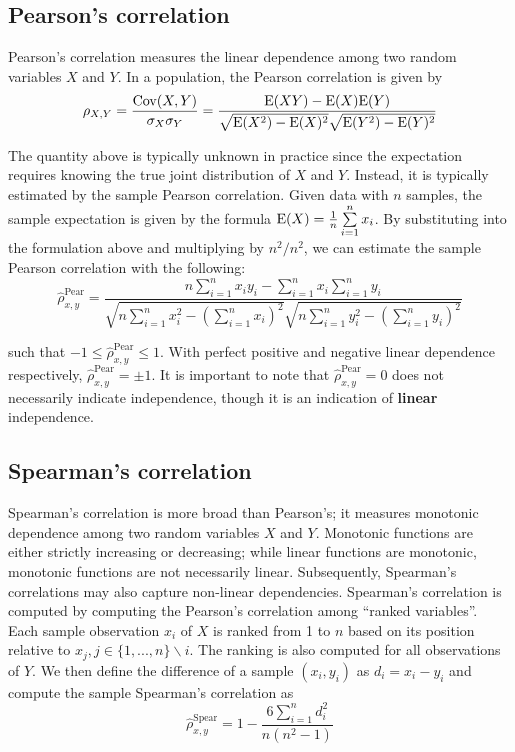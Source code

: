 \subsection{Pearson's correlation}

Pearson's correlation measures the linear dependence among two random variables
$X$ and $Y$. In a population, the Pearson correlation is given by
$$\rho_{X,Y}=\frac{\mathrm{Cov}(X,Y)}{\sigma_X \sigma_Y} =
\frac{\mathrm{E}(XY)-\mathrm{E}(X)\mathrm{E}(Y)}{\sqrt{\mathrm{E}(X^2)-\mathrm{E}(X)^2} \sqrt{\mathrm{E}(Y^2)-\mathrm{E}(Y)^2}}$$ 

The quantity above is typically unknown in practice since the expectation 
requires knowing the true joint distribution of $X$ and $Y$. Instead, it is 
typically estimated by the sample Pearson correlation. Given data with $n$ 
samples, the sample expectation is given by the formula  
$\mathrm{E}(X)=\frac{1}{n}\sum\limits_{i=1}^{n}x_i$. 
By substituting into the formulation above and multiplying by $n^2/n^2$, we can 
estimate the sample Pearson correlation with the following:
$$\hat{\rho}_{x,y}^\text{Pear}=
\frac{n \sum\limits_{i=1}^{n} x_i y_i - \sum\limits_{i=1}^{n} x_i
	\sum\limits_{i=1}^{n} y_i}
{\sqrt{n\sum\limits_{i=1}^{n} x_i^2-\left(\sum\limits_{i=1}^{n} x_i\right)^2} 
	\sqrt{n\sum\limits_{i=1}^{n} y_i^2-\left(\sum\limits_{i=1}^{n} y_i\right)^2}}$$ 

\noindent such that $-1 \leq \hat{\rho}_{x,y}^\text{Pear} \leq 1$. With perfect 
positive and negative linear 
dependence respectively, $\hat{\rho}_{x,y}^\text{Pear}=\pm1$.
It is important to note that $\hat{\rho}_{x,y}^\text{Pear}=0$ does not 
necessarily indicate independence, though it is an indication of 
\textbf{linear} independence.

\subsection{Spearman's correlation}

Spearman's correlation is more broad than Pearson's; it measures monotonic
dependence among two random variables $X$ and $Y$. Monotonic functions are
either strictly increasing or decreasing; while linear functions are monotonic,
monotonic functions are not necessarily linear. Subsequently, Spearman's
correlations may also capture non-linear dependencies. Spearman's correlation is
computed by computing the Pearson's correlation among ``ranked variables''. Each
sample observation $x_i$ of $X$ is ranked from 1 to $n$ based on its position
relative to $x_j, j\in\{1,...,n\}\backslash{i}$. The ranking is also computed
for all observations of $Y$. We then define the difference of a sample
$(x_i,y_i)$ as $d_i=x_i-y_i$ and compute the sample Spearman's correlation as
$$\hat{\rho}_{x,y}^{\text{Spear}}=
1-\frac{6 \sum\limits_{i=1}^{n}d_i^2}{n(n^2-1)}$$


